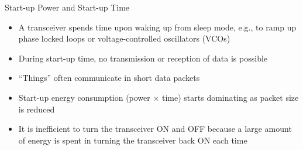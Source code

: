 \documentclass[aspectratio=169,11pt]{beamer}
\begin{document}
\begin{frame}{Start-up Power and Start-up Time}
    \begin{itemize}
        \item A transceiver spends time upon waking up from sleep mode, e.g., to ramp up phase locked loops or voltage-controlled oscillators (VCOs)
        \item During start-up time, no transmission or reception of data is possible
        \item ``Things'' often communicate in short data packets
        \item Start-up energy consumption (power $\times$ time) starts dominating as packet size is reduced
        \item It is inefficient to turn the transceiver ON and OFF because a large amount of energy is spent in turning the transceiver back ON each time
    \end{itemize}
\end{frame}
\end{document}

